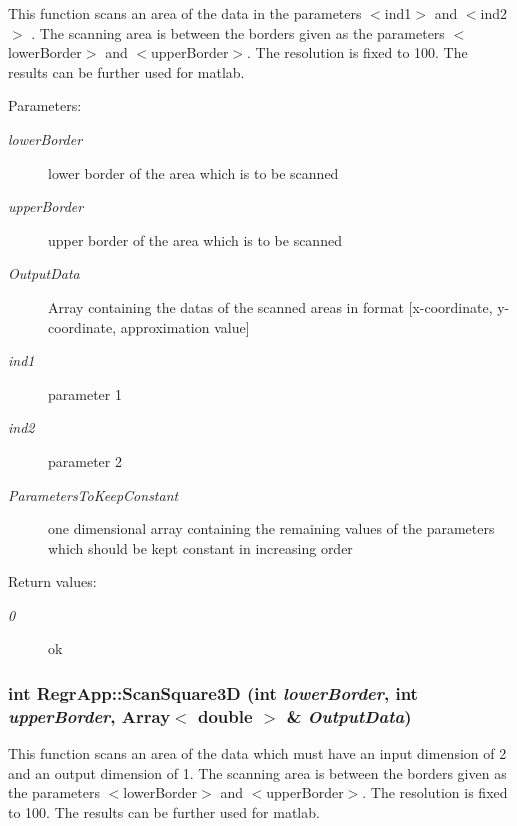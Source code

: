 This function scans an area of the data in the parameters $<$ind1$>$ and $<$ind2$>$ . The scanning area is between the borders given as the parameters $<$lower\-Border$>$ and $<$upper\-Border$>$. The resolution is fixed to 100. The results can be further used for matlab. 

\begin{Desc}
\item[Parameters:]
\begin{description}
\item[{\em lower\-Border}]lower border of the area which is to be scanned \item[{\em upper\-Border}]upper border of the area which is to be scanned \item[{\em Output\-Data}]Array containing the datas of the scanned areas in format [x-coordinate, y-coordinate, approximation value] \item[{\em ind1}]parameter 1 \item[{\em ind2}]parameter 2 \item[{\em Parameters\-To\-Keep\-Constant}]one dimensional array containing the remaining values of the parameters which should be kept constant in increasing order \end{description}
\end{Desc}
\begin{Desc}
\item[Return values:]
\begin{description}
\item[{\em 0}]ok \end{description}
\end{Desc}
\subsubsection{\setlength{\rightskip}{0pt plus 5cm}int Regr\-App::Scan\-Square3D (int {\em lower\-Border}, int {\em upper\-Border}, Array$<$ double $>$ \& {\em Output\-Data})}\label{classRegrApp_1ee97b91ff9b0ed39e1d240f7a7ad8d5}


This function scans an area of the data which must have an input dimension of 2 and an output dimension of 1. The scanning area is between the borders given as the parameters $<$lower\-Border$>$ and $<$upper\-Border$>$. The resolution is fixed to 100. The results can be further used for matlab. 

